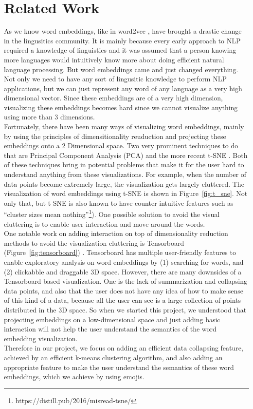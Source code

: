 \section{Related Work}
As we know word embeddings, like in word2vec \cite{word2vec}, have brought a drastic change in the lingusitics community. It is mainly because every early approach to NLP required a knowledge of linguistics and it was assumed that a person knowing more languages would intuitively know more about doing efficient natural language processing. But word embeddings came and just changed everything. Not only we need to have any sort of lingusitic knowledge to perform NLP applications, but we can just represent any word of any language as a very high dimensional vector. Since these embeddings are of a very high dimension, visualizing these embeddings becomes hard since we cannot visualize anything using more than 3 dimensions. \\

Fortunately, there have been many ways of visualizing word embeddings, mainly by using the principles of dimensitionality reuduction and projecting these embeddings onto a 2 Dimensional space. Two very prominent techniques to do that are Principal Component Analysis (PCA) \cite{pca} and the more recent t-SNE \cite{t-sne}. Both of these techniques bring in potential problems that make it for the user hard to understand anything from these visualizations. For example, when the number of data points become extremely large, the visualization gets largely cluttered. The visualization of word embeddings using t-SNE is shown in Figure~\ref{fig:t_sne}. Not only that, but t-SNE is also known to have counter-intuitive features such as ``cluster sizes mean nothing''\footnote{https://distill.pub/2016/misread-tsne/}). One possible solution to avoid the visual cluttering is to enable user interaction and move around the words. \\ 

One notable work on adding interaction on top of dimensionality reduction methods to avoid the visualization cluttering is Tensorboard (Figure~\ref{fig:tensorboard}) \cite{tensorboard_viz}. 
Tensorboard has multiple user-friendly features to enable exploratory analysis on word embeddings by (1) searching for words, and (2) clickabble and draggable 3D space. 
However, there are many downsides of a Tensorboard-based visualization. One is the lack of summarization and collapsing data points, and also that the user does not have any idea of how to make sense of this kind of a data, because all the user can see is a large collection of points distributed in the 3D space. So when we started this project, we understood that projecting embeddings on a low-dimensional space and just adding basic interaction will not help the user understand the semantics of the word embedding visualization. \\
   
Therefore in our project, we focus on adding an efficient data collapsing feature, achieved by an efficient k-means clustering algorithm, and also adding an appropriate feature to make the user understand the semantics of these word embeddings, which we achieve by using emojis. 
